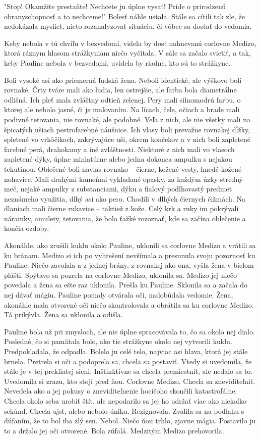 \documentclass{book}
\begin{document}
"$ $Stop! Okamžite prestaňte! Nechcete ju úplne vysať! Príde o prirodzenú obranyschopnosť a to nechceme!"$ $ Bolesť náhle ustala. Stále sa cítili tak zle, že nedokázala myslieť, nieto rozanalyzovať situáciu, či vôbec sa dostať do vedomia.

Keby nebola v tú chvíľu v bezvedomí, videla by dosť nahnevanú corlovne Medizo, ktorá ráznym hlasom strážkyniam niečo vyčítala. V sále sa začalo svietiť, a tak, keby Pauline nebola v bezvedomí, uvidela by riadne, kto sú to strážkyne.

Boli vysoké asi ako priemerná ľudská žena. Neboli identické, ale výškovo boli rovnaké. Črty tváre mali ako ľudia, len ostrejšie, ale farba bola diametrálne odlišná. Ich pleť mala zvláštny odtieň zelenej. Pery mali silnomodrú farbu, o ktorej ale nebolo jasné, či je maľovaním. Na lícach, čele, očiach a brade mali podivné tetovania, nie rovnaké, ale podobné. Veľa z nich, ale nie všetky mali na špicatých ušiach pestrofarebné náušnice. Ich vlasy boli prevažne rovnakej dĺžky, spletené vo vrkôčikoch, zakrývajúce uši, okrem končekov a v nich boli zapletené farebné perá, drahokamy a iné zvláštnosti. Niektoré z nich mali vo vlasoch zapletené dýky, úplne miniatúrne alebo jedna dokonca ampulku s nejakou tekutinou. Oblečené boli navlas rovnako – čierne, kožené vesty, hnedé kožené nohavice. Mali drahými kameňmi vykladané opasky, za každým úzky stredný meč, nejaké ampulky z substanciami, dýku a fialový podlhovastý predmet neznámeho využitia, dlhý asi ako pero. Chodili v dlhých čiernych čižmách. Na dlaniach mali čierne rukavice – taktiež z kože. Celý krk a ruky im pokrývali náramky, amulety, tetovania, že bolo ťažké rozoznať, kde sa začína oblečenie a končia ozdoby.

Akonáhle, ako zrušili kuklu okolo Pauline, uklonili sa corlovne Medizo a vrátili sa ku bránam. Medizo si ich po vyhrešení nevšímala a presunula svoju pozornosť ku Pauline. Niečo zavolala a z jednej brány, z rovnakej ako ona, vyšla žena v bielom plášti. Spýtavo sa pozrela na corlovne Medizo, uklonila sa. Medizo jej niečo povedala a žena sa ešte raz uklonila. Prešla ku Pauline. Sklonila sa a začala do nej dávať mágiu. Pauline pomaly otvárala oči, nadobúdala vedomie. Žena, akonáhle mala otvorené oči niečo skontrolovala a obrátila sa ku corlovne Medizo. Tá prikývla. Žena sa uklonila a odišla.

Pauline bola už pri zmysloch, ale nie úplne spracovávala to, čo sa okolo nej dialo. Posledné, čo si pamätala bolo, ako tie strážkyne okolo nej vytvorili kuklu. Predpokladala, že odpadla. Bolelo ju celé telo, najviac asi hlava, ktorá jej stále brnela. Pretrela si oči a podoprela sa, chcela sa postaviť. Vtedy si uvedomila, že stále je v tej prekliatej sieni. Inštinktívne sa chcela premiestniť, ale nedalo sa to. Uvedomila si zrazu, kto stojí pred ňou. Corlovne Medizo. Chcela sa zneviditeľniť. Nevedela ako a jej pokusy o zneviditeľnenie hocičoho skončili katastrofálne. Chcela okolo seba urobiť štít, ale nepodarilo sa jej ho udržať viac ako niekoľko sekúnd. Chcela ujsť, alebo nebolo úniku. Rezignovala. Zvalila sa na podlahu s dúfaním, že to bol iba zlý sen. Nebol. Niečo ňou trhlo, zjavne mágia. Postavilo ju to a držalo jej oči otvorené. Bola zúfalá. Medzitým Medizo prehovorila.
\end{document}
